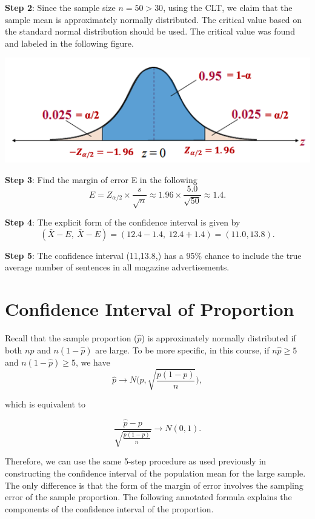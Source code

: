 \documentclass[
]{book}
\begin{document}
\textbf{Step 2}: Since the sample size \(n = 50 > 30\), using the CLT, we claim that the sample mean is approximately normally distributed. The critical value based on the standard normal distribution should be used. The critical value was found and labeled in the following figure.

\begin{center}\includegraphics[width=0.6\linewidth]{week07/example01CV} \end{center}

\textbf{Step 3}: Find the margin of error E in the following
\[
E = Z_{\alpha/2}\times \frac{s}{\sqrt{n}} \approx 1.96\times \frac{5.0}{\sqrt{50}} \approx 1.4.
\]

\textbf{Step 4}: The explicit form of the confidence interval is given by
\[
(\bar{X} - E, \ \bar{X} - E) = (12.4 - 1.4, \ 12.4 + 1.4) = (11.0, 13.8).
\]

\textbf{Step 5}: The confidence interval (11,13.8,) has a 95\% chance to include the true average number of sentences in all magazine advertisements.

\hfill\break

\hypertarget{confidence-interval-of-proportion}{%
\section{Confidence Interval of Proportion}\label{confidence-interval-of-proportion}}

Recall that the sample proportion (\(\hat{p}\)) is approximately normally distributed if both \(n\hat{p}\) and \(n(1-\hat{p})\) are large. To be more specific, in this course, if \(n\hat{p} \ge 5\) and \(n(1-\hat{p}) \ge 5\), we have
\[
\hat{p} \to N\Big(p, \sqrt{\frac{p(1-p)}{n}}  \Big),
\]

which is equivalent to

\[
\frac{\hat{p} - p}{\sqrt{\frac{p(1-p)}{n}}} \to N(0, 1).
\]

Therefore, we can use the same 5-step procedure as used previously in constructing the confidence interval of the population mean for the large sample. The only difference is that the form of the margin of error involves the sampling error of the sample proportion. The following annotated formula explains the components of the confidence interval of the proportion.
\end{document}
